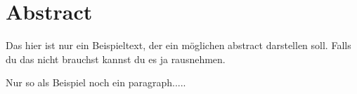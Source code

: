 \chapter*{Abstract} %

Das hier ist nur ein Beispieltext, der ein möglichen abstract darstellen soll. 
Falls du das nicht brauchst kannst du es ja rausnehmen. \par

Nur so als Beispiel noch ein paragraph.....
